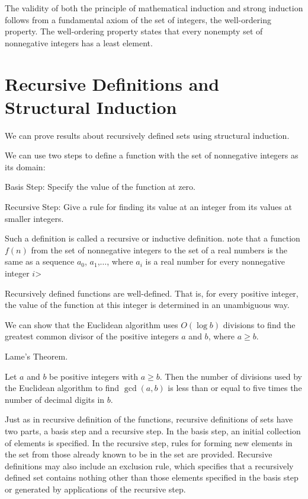 \documentclass[../discrete.tex]{subfiles}
\begin{document}
The validity of both the principle of mathematical induction and strong induction follows 
from a fundamental axiom of the set of integers, the well-ordering property.
The well-ordering property states that every nonempty set of nonnegative integers has a least element.
\section{Recursive Definitions and Structural Induction}
We can prove results about recursively defined sets using structural induction.

We can use two steps to define a function with the set of nonnegative integers as its domain:

Basis Step: Specify the value of the function at zero.

Recursive Step: Give a rule for finding its value at an integer from its values at smaller integers.

Such a definition is called a recursive or inductive definition. note that a function $f(n)$
from the set of nonnegative integers to the set of a real numbers is the same as a sequence 
$a_0$, $a_1$,$\dots$, where $a_i$ is a real number for every nonnegative integer $i$>

Recursively defined functions are well-defined. That is, for every positive integer, the value of the function at this integer is determined in an unambiguous way.

We can show that the Euclidean algorithm uses $O(\log b)$ divisions to find the 
greatest common divisor of the positive integers $a$ and $b$, where $a\geq b$.
\begin{theorem}
    Lame's Theorem.

    Let $a$ and $b$ be positive integers with $a\geq b$. Then the number of divisions 
    used by the Euclidean algorithm to find $\gcd (a,b)$ is less than or equal to five 
    times the number of decimal digits in $b$.
\end{theorem}

Just as in recursive definition of the functions, recursive definitions of sets have two parts, 
a basis step and a recursive step. In the basis step, an initial collection of 
elements is specified. In the recursive step, rules for forming new elements in the set 
from those already known to be in the set are provided. Recursive definitions 
may also include an exclusion rule, which specifies that a recursively defined set contains 
nothing other than those elements specified in the basis step or generated by applications 
of the recursive step.
\end{document}
